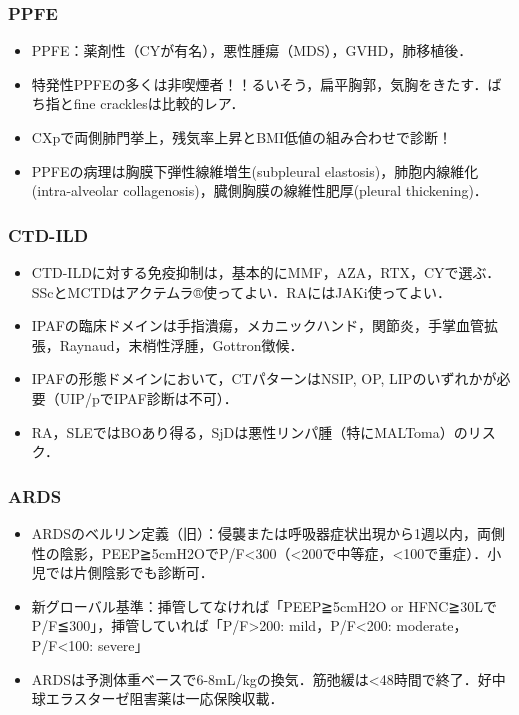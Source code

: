 \subsubsection{PPFE}
\begin{itemize}
\item PPFE：薬剤性（CYが有名），悪性腫瘍（MDS），GVHD，肺移植後．
\item 特発性PPFEの多くは非喫煙者！！るいそう，扁平胸郭，気胸をきたす．ばち指とfine cracklesは比較的レア．
\item CXpで両側肺門挙上，残気率上昇とBMI低値の組み合わせで診断！
\item PPFEの病理は胸膜下弾性線維増生(subpleural elastosis)，肺胞内線維化(intra-alveolar collagenosis)，臓側胸膜の線維性肥厚(pleural thickening)．
\end{itemize}


\subsubsection{CTD-ILD}
\begin{itemize}
\item CTD-ILDに対する免疫抑制は，基本的にMMF，AZA，RTX，CYで選ぶ．SScとMCTDはアクテムラ®使ってよい．RAにはJAKi使ってよい．
\item IPAFの臨床ドメインは手指潰瘍，メカニックハンド，関節炎，手掌血管拡張，Raynaud，末梢性浮腫，Gottron徴候．
\item IPAFの形態ドメインにおいて，CTパターンはNSIP, OP, LIPのいずれかが必要（UIP/pでIPAF診断は不可）．
\item RA，SLEではBOあり得る，SjDは悪性リンパ腫（特にMALToma）のリスク．
\end{itemize}


\subsubsection{ARDS}
\begin{itemize}
\item ARDSのベルリン定義（旧）：侵襲または呼吸器症状出現から1週以内，両側性の陰影，PEEP≧5cmH2OでP/F<300（<200で中等症，<100で重症）．小児では片側陰影でも診断可．
\item 新グローバル基準：挿管してなければ「PEEP≧5cmH2O or HFNC≧30LでP/F≦300」，挿管していれば「P/F>200: mild，P/F<200: moderate，P/F<100: severe」
\item ARDSは予測体重ベースで6-8mL/kgの換気．筋弛緩は<48時間で終了．好中球エラスターゼ阻害薬は一応保険収載．
\end{itemize}


